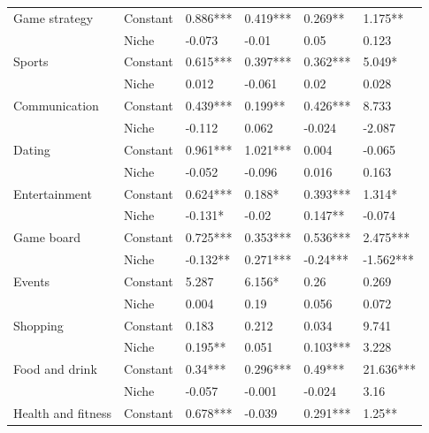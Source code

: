 \begin{longtable}[h!]{llllll}
\cline{1-6}
\multirow{2}{*}{Game strategy} & Constant &            0.886*** &    0.419*** &    0.269** &    1.175** \\
          & Niche &              -0.073 &       -0.01 &       0.05 &      0.123 \\
\cline{1-6}
\multirow{2}{*}{Sports} & Constant &            0.615*** &    0.397*** &   0.362*** &     5.049* \\
          & Niche &               0.012 &      -0.061 &       0.02 &      0.028 \\
\cline{1-6}
\multirow{2}{*}{Communication} & Constant &            0.439*** &     0.199** &   0.426*** &      8.733 \\
          & Niche &              -0.112 &       0.062 &     -0.024 &     -2.087 \\
\cline{1-6}
\multirow{2}{*}{Dating} & Constant &            0.961*** &    1.021*** &      0.004 &     -0.065 \\
          & Niche &              -0.052 &      -0.096 &      0.016 &      0.163 \\
\cline{1-6}
\multirow{2}{*}{Entertainment} & Constant &            0.624*** &      0.188* &   0.393*** &     1.314* \\
          & Niche &             -0.131* &       -0.02 &    0.147** &     -0.074 \\
\cline{1-6}
\multirow{2}{*}{Game board} & Constant &            0.725*** &    0.353*** &   0.536*** &   2.475*** \\
          & Niche &            -0.132** &    0.271*** &   -0.24*** &  -1.562*** \\
\cline{1-6}
\multirow{2}{*}{Events} & Constant &               5.287 &      6.156* &       0.26 &      0.269 \\
          & Niche &               0.004 &        0.19 &      0.056 &      0.072 \\
\cline{1-6}
\multirow{2}{*}{Shopping} & Constant &               0.183 &       0.212 &      0.034 &      9.741 \\
          & Niche &             0.195** &       0.051 &   0.103*** &      3.228 \\
\cline{1-6}
\multirow{2}{*}{Food and drink} & Constant &             0.34*** &    0.296*** &    0.49*** &  21.636*** \\
          & Niche &              -0.057 &      -0.001 &     -0.024 &       3.16 \\
\cline{1-6}
\multirow{2}{*}{Health and fitness} & Constant &            0.678*** &      -0.039 &   0.291*** &     1.25** \\

\end{longtable}
